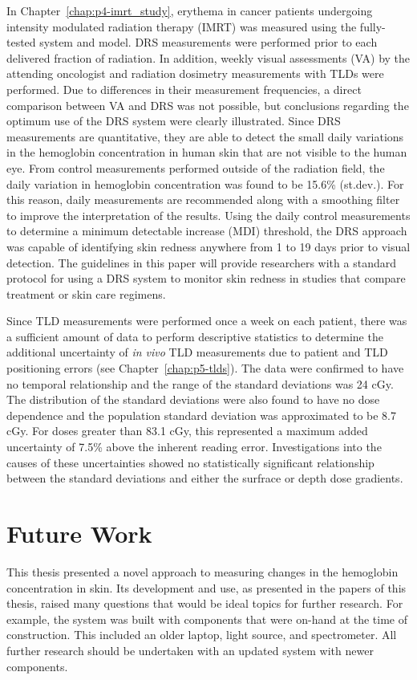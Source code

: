 In Chapter~\ref{chap:p4-imrt_study}, erythema in cancer patients undergoing intensity modulated radiation therapy (IMRT) was measured using the fully-tested system and model. DRS measurements were performed prior to each delivered fraction of radiation. In addition, weekly visual assessments (VA) by the attending oncologist and radiation dosimetry measurements with TLDs were performed. Due to differences in their measurement frequencies, a direct comparison between VA and DRS was not possible, but conclusions regarding the optimum use of the DRS system were clearly illustrated. Since DRS measurements are quantitative, they are able to detect the small daily variations in the hemoglobin concentration in human skin that are not visible to the human eye. From control measurements performed outside of the radiation field, the daily variation in hemoglobin concentration was found to be 15.6\% (st.dev.). For this reason, daily measurements are recommended along with a smoothing filter to improve the interpretation of the results. Using the daily control measurements to determine a minimum detectable increase (MDI) threshold, the DRS approach was capable of identifying skin redness anywhere from 1 to 19 days prior to visual detection. The guidelines in this paper will provide researchers with a standard protocol for using a DRS system to monitor skin redness in studies that compare treatment or skin care regimens.

Since TLD measurements were performed once a week on each patient, there was a sufficient amount of data to perform descriptive statistics to determine the additional uncertainty of \emph{in vivo} TLD measurements due to patient and TLD positioning errors (see Chapter~\ref{chap:p5-tlds}). The data were confirmed to have no temporal relationship and the range of the standard deviations was 24 cGy. The distribution of the standard deviations were also found to have no dose dependence and the population standard deviation was approximated to be 8.7 cGy. For doses greater than 83.1 cGy, this represented a maximum added uncertainty of 7.5\% above the inherent reading error. Investigations into the causes of these uncertainties showed no statistically significant relationship between the standard deviations and either the surfrace or depth dose gradients.

\section{Future Work}
This thesis presented a novel approach to measuring changes in the hemoglobin concentration in skin. Its development and use, as presented in the papers of this thesis, raised many questions that would be ideal topics for further research. For example, the system was built with components that were on-hand at the time of construction. This included an older laptop, light source, and spectrometer. All further research should be undertaken with an updated system with newer components.

